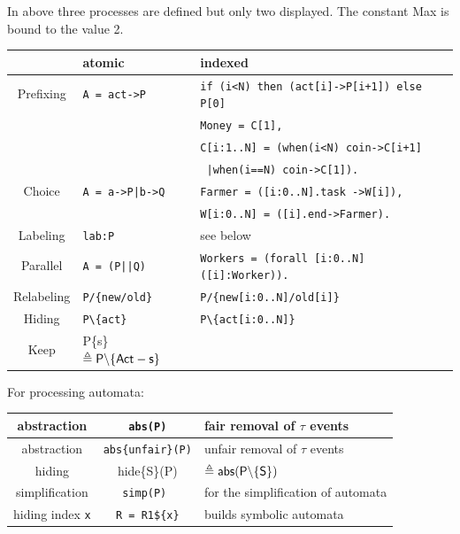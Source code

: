 \documentclass[]{article}
\begin{document}
\noindent In above three processes are defined but only two displayed.  The constant Max is bound to the value 2.


\vspace{2ex}\begin{tabular}{|c|l|l|} \hline
& atomic & indexed \\ \hline
Prefixing & \verb$A = act->P$ &  \verb$if (i<N) then (act[i]->P[i+1]) else P[0]$ \\ \hline
  & &  \verb$Money = C[1], $ \\
  & & \verb$C[i:1..N] = (when(i<N) coin->C[i+1]$ \\
       &   & \hspace{1.7cm} \verb$ |when(i==N) coin->C[1]).$ \\ \hline
Choice  &  \verb$A = a->P|b->Q$  &\verb$Farmer = ([i:0..N].task ->W[i]),$ \\
    &   &\hspace{0.7cm}\verb$W[i:0..N] = ([i].end->Farmer).$ \\ \hline
Labeling & \verb$lab:P$ &  see below \\ \hline
Parallel &  \verb$A = (P||Q)$ & \verb$Workers = (forall [i:0..N] ([i]:Worker)).$ \\ \hline
Relabeling & \verb$P/{new/old}$ &  \verb$P/{new[i:0..N]/old[i]}$ \\ \hline
Hiding & \verb$P\{act}$ & \verb$P\{act[i:0..N]}$ \\ \hline %
Keep  & {\sf P\{s\}}  $\sf \triangleq  P\backslash \{Act- s\}$ & \\ \hline
\end{tabular}

\vspace{2ex}\noindent For processing automata:

\vspace{2ex}
\begin{tabular}{|c|c|l|}
\hline abstraction  & {\tt abs(P)} & fair removal of $\tau$ events \\
\hline abstraction  & {\tt abs\{unfair\}(P)} & unfair  removal of $\tau$ events \\ 
\hline hiding  & {\sf hide\{S\}(P)} & $\sf \triangleq  abs(P\backslash \{S\})$ \\ \hline
simplification  & {\tt simp(P) } & for the simplification of automata \\ \hline
hiding index \verb|x| &\verb|R = R1${x}|&  builds symbolic automata \\ \hline
\end{tabular}
\end{document}
